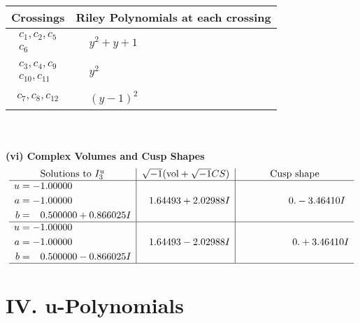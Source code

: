 \documentclass[1p]{elsarticle_modified}
\theoremstyle{definition}
\newcommand{\I}{\sqrt{-1}}
\begin{document}
\begin{tabular}{m{50pt}|m{274pt}}
Crossings & \hspace{64pt}Riley Polynomials at each crossing \\
\hline $$\begin{aligned}c_{1},c_{2},c_{5}\\c_{6}\end{aligned}$$&$\begin{aligned}
&y^2+y+1
\end{aligned}$\\
\hline $$\begin{aligned}c_{3},c_{4},c_{9}\\c_{10},c_{11}\end{aligned}$$&$\begin{aligned}
&y^2
\end{aligned}$\\
\hline $$\begin{aligned}c_{7},c_{8},c_{12}\end{aligned}$$&$\begin{aligned}
&(y-1)^2
\end{aligned}$\\
\hline
\end{tabular}\\~\\
\newpage\flushleft \textbf{(vi) Complex Volumes and Cusp Shapes}
$$\begin{array}{c|c|c}  
\text{Solutions to }I^u_{3}& \I (\text{vol} + \sqrt{-1}CS) & \text{Cusp shape}\\
 \hline 
\begin{aligned}
u &= -1.00000\phantom{ +0.000000I} \\
a &= -1.00000\phantom{ +0.000000I} \\
b &= \phantom{-}0.500000 + 0.866025 I\end{aligned}
 & \phantom{-}1.64493 + 2.02988 I & \phantom{-0.000000 } 0. - 3.46410 I \\ \hline\begin{aligned}
u &= -1.00000\phantom{ +0.000000I} \\
a &= -1.00000\phantom{ +0.000000I} \\
b &= \phantom{-}0.500000 - 0.866025 I\end{aligned}
 & \phantom{-}1.64493 - 2.02988 I & \phantom{-0.000000 -}0. + 3.46410 I\\
 \hline 
 \end{array}$$\newpage
\newpage\renewcommand{\arraystretch}{1}
\centering \section*{ IV. u-Polynomials}
\end{document}
